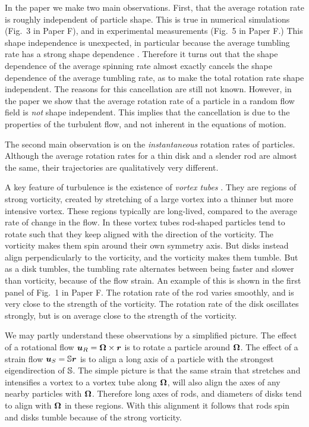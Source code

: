 \documentclass[thesis.tex]{subfiles}
\begin{document}
In the paper we make two main observations. First, that the average rotation rate is roughly independent of particle shape. This is true in numerical simulations (Fig.~3 in Paper F), and in experimental measurements (Fig.~5 in Paper F.) This shape independence is unexpected, in particular because the average tumbling rate has a strong shape dependence \cite{parsa2012,gustavsson2014}. Therefore it turns out that the shape dependence of the average spinning rate almost exactly cancels the shape dependence of the average tumbling rate, as to make the total rotation rate shape independent. The reasons for this cancellation are still not known. However, in the paper we show that the average rotation rate of a particle in a random flow field is \emph{not} shape independent. This implies that the cancellation is due to the properties of the turbulent flow, and not inherent in the equations of motion.

The second main observation is on the \emph{instantaneous} rotation rates of particles. Although the average rotation rates for a thin disk and a slender rod are almost the same, their trajectories are qualitatively very different.

A key feature of turbulence is the existence of \emph{vortex tubes} \cite{she1990}. They are regions of strong vorticity, created by stretching of a large vortex into a thinner but more intensive vortex. These regions typically are long-lived, compared to the average rate of change in the flow. In these vortex tubes rod-shaped particles tend to rotate such that they keep aligned with the direction of the vorticity. The vorticity makes them spin around their own symmetry axis. But disks instead align perpendicularly to the vorticity, and the vorticity makes them tumble. But as a disk tumbles, the tumbling rate alternates between being faster and slower than vorticity, because of the flow strain. An example of this is shown in the first panel of Fig.~1 in Paper F. The rotation rate of the rod varies smoothly, and is very close to the strength of the vorticity. The rotation rate of the disk oscillates strongly, but is on average close to the strength of the vorticity.

We may partly understand these observations by a simplified picture. The effect of a rotational flow $\mbox{\boldmath$u$}_R= \mbox{\boldmath$\Omega$} \times \mbox{\boldmath$r$}$ is to rotate a particle around $\mbox{\boldmath$\Omega$}$. The effect of a strain flow $\mbox{\boldmath$u$}_S=\mathbb{S} \mbox{\boldmath$r$}$ is to align a long axis of a particle with the strongest eigendirection of $\mathbb{S}$. The simple picture is that the same strain that stretches and intensifies a vortex to a vortex tube along $\mbox{\boldmath$\Omega$}$, will also align the axes of any nearby particles with $\mbox{\boldmath$\Omega$}$. Therefore long axes of rods, and diameters of disks tend to align with $\mbox{\boldmath$\Omega$}$ in these regions. With this alignment it follows that rods spin and disks tumble because of the strong vorticity.
\end{document}
